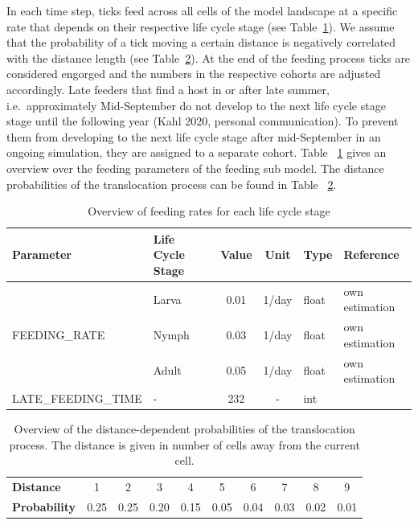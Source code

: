 \documentclass[a4paper, 11pt]{scrartcl}
\begin{document}
In each time step, ticks feed across all cells of the model landscape at a specific rate that depends on their respective life cycle stage (see Table~\ref{tab:feeding_parameters}). We assume that the probability of a tick moving a certain distance is negatively correlated with the distance length (see Table~\ref{tab:distance_probabilities}). At the end of the feeding process ticks are considered engorged and the numbers in the respective cohorts are adjusted accordingly. Late feeders that find a host in or after late summer, i.e.\ approximately Mid-September do not develop to the next life cycle stage stage until the following year (Kahl 2020, personal communication). To prevent them from developing to the next life cycle stage after mid-September in an ongoing simulation, they are assigned to a separate cohort. Table ~\ref{tab:feeding_parameters} gives an overview over the feeding parameters of the feeding sub model. The distance probabilities of the translocation process can be found in Table ~\ref{tab:distance_probabilities}.

\begin{table}[h!]
\caption[Overview of feeding rates for each life cycle stage]{Overview of feeding rates for each life cycle stage}
\label{tab:feeding_parameters}
\begin{tabularx}{\textwidth}{llccll}
\toprule
\textbf{Parameter} & \textbf{Life Cycle Stage} & \textbf{Value} & \textbf{Unit} & \textbf{Type}	& \textbf{Reference} \\
\midrule
\multirow{3}{*}{\tiny{FEEDING\_RATE}} & Larva	& 0.01	& 1/day & float	 & own estimation \\
									  & Nymph	& 0.03	& 1/day & float	 & own estimation \\
									  & Adult	& 0.05	& 1/day & float	 & own estimation \\
\tiny{LATE\_FEEDING\_TIME}			  & - & 232 & -	& int	 & \textcite{tba} \\
\bottomrule
\end{tabularx}
\end{table}

\begin{table}[h!]
\centering
\caption[Overview of distance-dependent probabilities of the translocation process]{Overview of the distance-dependent probabilities of the translocation process. The distance is given in number of cells away from the current cell.}
\label{tab:distance_probabilities}
\begin{tabularx}{\textwidth}{lccccccccc}
\toprule
\textbf{Distance} & 1 & 2 & 3 & 4 & 5 & 6 & 7 & 8 & 9 \\
\textbf{Probability} & 0.25 & 0.25 & 0.20 & 0.15 & 0.05 & 0.04 & 0.03 & 0.02 & 0.01 \\
\bottomrule
\end{tabularx}
\end{table}
\end{document}
